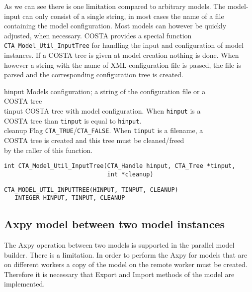 \documentclass[a4paper,12pt]{article}
\begin{document}
As we can see there is one limitation compared to arbitrary models. The
model-input can only consist of a single string, in most cases the name of
a file containing the model configuration. Most models can however be quickly
adjusted, when necessary. COSTA provides a special function {\tt
CTA\_Model\_Util\_InputTree} for handling
the input and configuration of model instances. If a COSTA tree is given
at model creation nothing is done. When however a string with the name of
XML-configuration file is passed, the file is parsed and the corresponding
configuration tree is created.

\horzline
\begin{tabbing}
\functab
{}
  {hinput}  {Models configuration; a string of the
configuration file or a}\\
\funcline{}    {}        {COSTA tree}\\
 {tinput}  {COSTA tree with model configuration.
                          When {\tt hinput} is a }\\
\funcline{}    {}        {COSTA tree than {\tt tinput} is equal to
                          {\tt hinput}.}\\
 {cleanup}  {Flag {\tt CTA\_TRUE}/{\tt CTA\_FALSE}. When
{\tt tinput} is a filename, a }\\
\funcline{}    {}        {COSTA tree is created and this tree must be
cleaned/freed }\\
\funcline{}    {}        {by the caller of this function.}\\
\end{tabbing}
\horzline

\begin{verbatim}
int CTA_Model_Util_InputTree(CTA_Handle hinput, CTA_Tree *tinput,
                             int *cleanup)
\end{verbatim}

\begin{verbatim}
CTA_MODEL_UTIL_INPUTTREE(HINPUT, TINPUT, CLEANUP)
   INTEGER HINPUT, TINPUT, CLEANUP
\end{verbatim}

\subsection{Axpy model between two model instances}
The Axpy operation between two models is supported in the parallel model
builder. There is a limitation. In order to perform the Axpy for models
that are on different workers a copy of the model on the remote worker must
be created. Therefore it is necessary that Export and Import methods of the
model are implemented.
\end{document}
